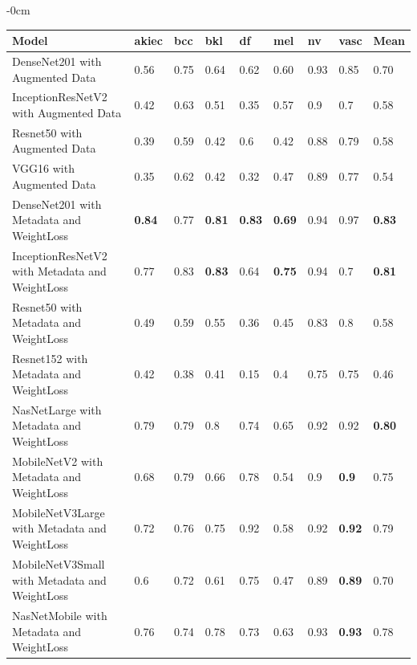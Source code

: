 \documentclass[sensors,article,accept,pdftex,moreauthors]{Definitions/mdpi}
\begin{document}
\begin{table}[H]
\begin{adjustwidth}{-\extralength}{0cm}
\centering
\begin{tabular}{p{9cm}  p{0.8cm}  p{0.8cm}  p{0.6cm}  p{0.6cm}  p{0.6cm}  p{0.6cm}  p{0.8cm}  p{0.9cm}} 
	\toprule
	\textbf{Model} & \textbf{akiec} & \textbf{bcc} & \textbf{bkl} & \textbf{df} & \textbf{mel} & \textbf{nv} & \textbf{vasc} & \textbf{Mean} \\
	\midrule
	DenseNet201 with Augmented Data & 0.56 & 0.75 & 0.64 & 0.62 & 0.60 & 0.93 & 0.85 & 0.70 \\ 
	\midrule
	InceptionResNetV2 with Augmented Data & 0.42 &	0.63 & 0.51 & 0.35 & 0.57 & 0.9 & 0.7 & 0.58\\
	\midrule
	Resnet50 with Augmented Data & 0.39 & 0.59 & 0.42 & 0.6 & 0.42 & 0.88 & 0.79 & 0.58\\
	\midrule 	
	VGG16 with Augmented Data & 0.35 & 0.62 & 0.42 & 0.32 & 0.47 & 0.89 & 0.77 & 0.54\\ 
	\midrule		
	DenseNet201 with Metadata and WeightLoss & \textbf{{0.84} %
} & 0.77 & \textbf{0.81} & \textbf{0.83} & \textbf{0.69} & 0.94 & 0.97 & \textbf{0.83}\\
	\midrule
	InceptionResNetV2 with Metadata and WeightLoss & 0.77 & 0.83 & \textbf{0.83} & 0.64 & \textbf{0.75} & 0.94 & 0.7 & \textbf{0.81}\\
	\midrule
	Resnet50 with Metadata and WeightLoss & 0.49 & 0.59 & 0.55 & 0.36 & 0.45 & 0.83 & 0.8 & 0.58\\
	\midrule
	Resnet152 with Metadata and WeightLoss & 0.42 & 0.38 & 0.41 & 0.15 & 0.4 & 0.75 & 0.75 & 0.46\\
	\midrule
	NasNetLarge with Metadata and WeightLoss & 0.79 & 0.79 & 0.8 & 0.74 & 0.65 & 0.92 & 0.92 & \textbf{0.80}\\
	\midrule
	MobileNetV2 with Metadata and WeightLoss & 0.68 & 0.79 & 0.66 & 0.78 & 0.54 & 0.9 & \textbf{0.9} & 0.75\\
	\midrule
	MobileNetV3Large with Metadata and WeightLoss & 0.72 & 0.76 & 0.75 & 0.92 & 0.58 & 0.92 & \textbf{0.92} & 0.79\\
	\midrule
	MobileNetV3Small with Metadata and WeightLoss & 0.6 & 0.72 & 0.61 & 0.75 & 0.47 & 0.89 & \textbf{0.89} & 0.70\\
	\midrule
	NasNetMobile with Metadata and WeightLoss & 0.76 & 0.74 & 0.78 & 0.73 & 0.63 & 0.93 & \textbf{0.93} & 0.78\\
	\bottomrule
\end{tabular}
\end{adjustwidth}
		\end{table}
\end{document}
